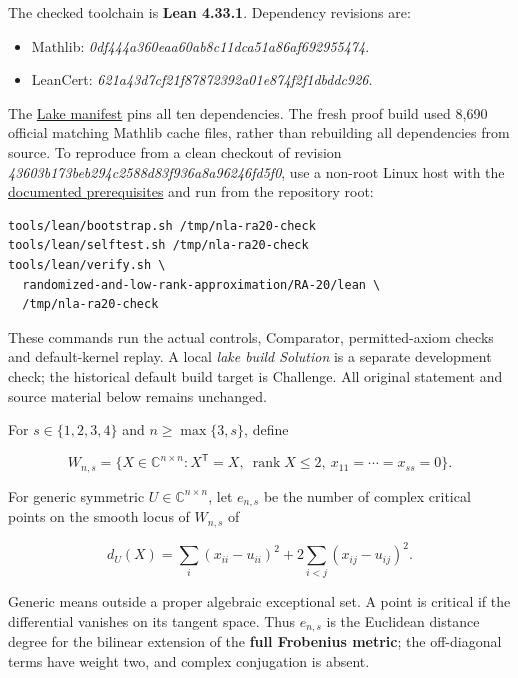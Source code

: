 \documentclass[11pt,a4paper]{article}
\makeatletter
\providecommand{\tightlist}{\setlength{\itemsep}{0pt}\setlength{\parskip}{0pt}}
\renewcommand{\subsection}{\Needspace{4\baselineskip}\@startsection{subsection}{2}{0pt}{9pt plus 1pt minus 1pt}{3pt}{\sffamily\bfseries\normalsize\color{ink}}}
\makeatother
\begin{document}
The checked toolchain is \textbf{Lean 4.33.1}. Dependency revisions are:

\begin{itemize}
\tightlist
\item
  Mathlib: \textit{0df444a360eaa60ab8c11dca51a86af692955474}.
\item
  LeanCert: \textit{621a43d7cf21f87872392a01e874f2f1dbddc926}.
\end{itemize}

The
\href{https://github.com/ajt60gaibb/OpenProblemsInNLA/blob/main/randomized-and-low-rank-approximation/RA-20/lean/lake-manifest.json}{Lake
manifest} pins all ten dependencies. The fresh proof build used 8,690
official matching Mathlib cache files, rather than rebuilding all
dependencies from source. To reproduce from a clean checkout of revision
\textit{43603b173beb294c2588d83f936a8a96246fd5f0}, use a non-root Linux
host with the
\href{https://github.com/ajt60gaibb/OpenProblemsInNLA/blob/main/tools/lean/HARNESS.md}{documented
prerequisites} and run from the repository root:

\begin{verbatim}
tools/lean/bootstrap.sh /tmp/nla-ra20-check
tools/lean/selftest.sh /tmp/nla-ra20-check
tools/lean/verify.sh \
  randomized-and-low-rank-approximation/RA-20/lean \
  /tmp/nla-ra20-check
\end{verbatim}

These commands run the actual controls, Comparator, permitted-axiom
checks and default-kernel replay. A local \textit{lake build Solution}
is a separate development check; the historical default build target is
Challenge. All original statement and source material below remains
unchanged.

\subsection{Statement}\label{statement}

For \(s\in\{1,2,3,4\}\) and \(n\ge\max\{3,s\}\), define

\[W_{n,s}=\{X\in\mathbb C^{n\times n}:X^{\mathsf T}=X,
\ \mathop{\mathrm{rank}}\nolimits X\le2,\ x_{11}=\cdots=x_{ss}=0\}.\]

For generic symmetric \(U\in\mathbb C^{n\times n}\), let \(e_{n,s}\) be
the number of complex critical points on the smooth locus of \(W_{n,s}\)
of

\[d_U(X)=\sum_i(x_{ii}-u_{ii})^2+
2\sum_{i< j}(x_{ij}-u_{ij})^2.\]

Generic means outside a proper algebraic exceptional set. A point is
critical if the differential vanishes on its tangent space. Thus
\(e_{n,s}\) is the Euclidean distance degree for the bilinear extension
of the \textbf{full Frobenius metric}; the off-diagonal terms have
weight two, and complex conjugation is absent.
\end{document}
